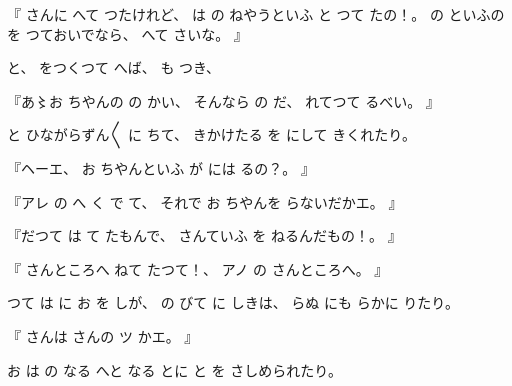%
『
さんに
へて
つたけれど、
%
は
の
ねやうといふ
と
つて
たの！。
%
の
といふのを
つておいでなら、
%
へて
さいな。
』

%
と、
%
をつくつて
へば、
%
も
つき、

%
『あ〻お
ちやんの
の
かい、
%
そんなら
の
だ、
%
れてつて
るべい。
』

%
と
ひながらずん〳〵
に
ちて、
%
きかけたる
を
にして
きくれたり。

%
『ヘーエ、
%
お
ちやんといふ
が
には
るの？。
』

%
『アレ
の
へ
く
で
て、
%
それで
お
ちやんを
らないだかエ。
』

%
『だつて
は
て
たもんで、
%
さんていふ
を
ねるんだもの！。
』

%
『
さんところへ
ねて
たつて！、
%
アノ
の
さんところへ。
』

%
つて
は
に
お
を
しが、
%
の
びて
に
しきは、
%
らぬ
にも
らかに
りたり。

%
『
さんは
さんの
ツ
かエ。
』

%
お
は
の
なる
へと
なる
とに
と
を
さしめられたり。


